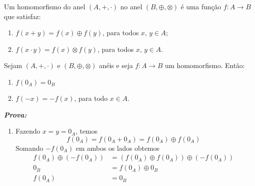 \documentclass{beamer}
\begin{document}
    \begin{frame}
        \begin{definicao}
            Um homomorfismo do anel $(A, +, \cdot)$ no anel $(B, \oplus, \otimes)$ {\'e} uma fun{\c c}{\~a}o $f : A \to B$ que satisfaz:
            \begin{enumerate}[label={\roman*})]
                \item $f(x + y) = f(x) \oplus f(y)$, para todos $x$, $y \in A$;

                \vspace{.5cm}
                
                \item $f(x \cdot y) = f(x)\otimes f(y)$, para todos $x$, $y \in A$.
                
                \vspace{.5cm}
            \end{enumerate}
        \end{definicao}
    \end{frame}

    \begin{frame}
        \begin{proposicao}
            Sejam $(A, +, \cdot)$ e $(B, \oplus, \otimes)$ an\'eis e seja $f : A \to B$ um homomorfismo. Ent{\~a}o:
            \begin{enumerate}[label={\roman*})]
                \item $f(0_{A}) = 0_{B}$

                \vspace{.5cm}

                \item $f(-x) = -f(x)$, para todo $x \in A$.
            \end{enumerate}
        \end{proposicao}

        \noindent \textbf{\textit{Prova: }}
        \begin{enumerate}[label={\roman*})]
            \item Fazendo $x = y = 0_{A}$, temos
            \[
                f(0_A) = f(0_A + 0_A) = f(0_A) \oplus f(0_A)
             \]
            Somando $-f(0_A)$ em ambos os lados obtemos
            \begin{align*}
                f(0_A) \oplus (-f(0_A)) &= (f(0_A)\oplus f(0_A)) \oplus (-f(0_A))\\
                0_B &= f(0_A) \oplus 0_B\\
                f(0_A) &= 0_B
            \end{align*}
        \seti
        \end{enumerate}
    \end{frame}
\end{document}
